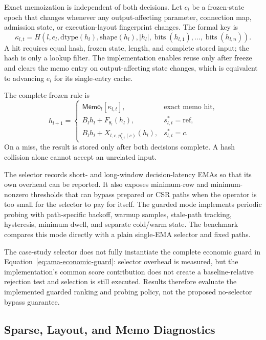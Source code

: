\documentclass{article}
\begin{document}
Exact memoization is independent of both decisions. Let $e_l$ be a frozen-state
epoch that changes whenever any output-affecting parameter, connection map,
admission state, or execution-layout fingerprint changes. The formal key is
\begin{equation}
\kappa_{l,t}=H\!\left(l,e_l,\mathrm{dtype}(h_l),\mathrm{shape}(h_l),|h_l|,
\operatorname{bits}(h_{l,1}),\ldots,\operatorname{bits}(h_{l,n})\right).
\label{eq:achf-memo-key}
\end{equation}
A hit requires equal hash, frozen state, length, and complete stored input; the
hash is only a lookup filter. The implementation enables reuse only after
freeze and clears the memo entry on output-affecting state changes, which is
equivalent to advancing $e_l$ for its single-entry cache.

The complete frozen rule is
\begin{equation}
h_{l+1}=
\begin{cases}
\mathsf{Memo}_l[\kappa_{l,t}], & \text{exact memo hit},\\
B_lh_l+F_{\theta_l}(h_l), & s^*_{l,t}=\mathrm{ref},\\
B_lh_l+X_{l,c,p^*_{l,t}(c)}(h_l), & s^*_{l,t}=c.
\end{cases}
\label{eq:achf-frozen-inference}
\end{equation}
On a miss, the result is stored only after both decisions complete. A hash
collision alone cannot accept an unrelated input.

The selector records short- and long-window decision-latency EMAs so that its
own overhead can be reported. It also exposes minimum-row and minimum-nonzero
thresholds that can bypass prepared or CSR paths when the operator is too
small for the selector to pay for itself. The guarded mode implements periodic
probing with path-specific backoff, warmup samples, stale-path tracking,
hysteresis, minimum dwell, and separate cold/warm state. The benchmark compares
this mode directly with a plain single-EMA selector and fixed paths.

The case-study selector does not fully instantiate the complete economic guard
in Equation~\eqref{eq:ama-economic-guard}: selector overhead is measured, but
the implementation's common score contribution does not create a
baseline-relative rejection test and selection is still executed. Results
therefore evaluate the implemented guarded ranking and probing policy, not the
proposed no-selector bypass guarantee.

\subsection{Sparse, Layout, and Memo Diagnostics}
\end{document}
